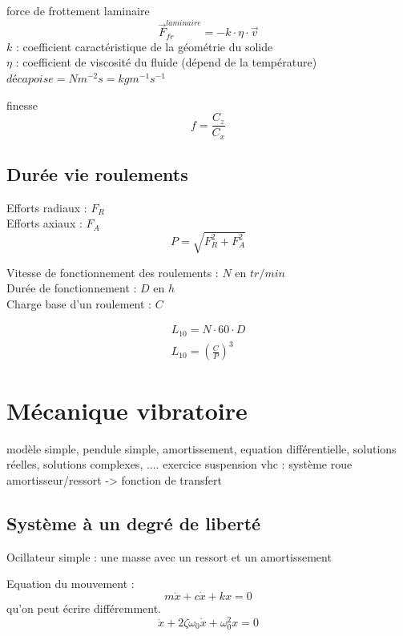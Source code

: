 	force de frottement laminaire
	\begin{equation}
	\vec{F}_{fr}^{laminaire}=-k \cdot \eta \cdot \vec{v} 
	\end{equation}
	$k$ : coefficient caractéristique de la géométrie du solide\\
	$\eta$ : coefficient de viscosité du fluide (dépend de la température) $décapoise = N m^{-2}s = kg m^{-1}s^{-1}$
	
	finesse
	\begin{equation}
	f= \frac{C_z}{C_x}
	\end{equation}
	
	
	\subsection{Durée vie roulements}
	Efforts radiaux : $F_R$\\
	Efforts axiaux : $F_A$ \\
	\begin{equation}
	P=\sqrt{F_R^2+F_A^2}
	\end{equation}
	
	Vitesse de fonctionnement des roulements : $N$ en $tr/min$\\
	Durée de fonctionnement : $D$ en $h$\\
	Charge base d'un roulement : $C$ 
	
	\begin{eqnarray}
	L_{10}=N \cdot 60 \cdot D\\
	L_{10}=(\frac{C}{P})^3
	\end{eqnarray}
	
	
	
	\newpage
	\section{Mécanique vibratoire}
	modèle simple, pendule simple, amortissement, equation différentielle, solutions réelles, solutions complexes, ....
	exercice suspension vhc : système roue amortisseur/ressort -> fonction de transfert
	
	\subsection{Système à un degré de liberté}
	
	Ocillateur simple : une masse avec un ressort et un amortissement
	
	Equation du mouvement :
	\begin{equation}
	m \ddot{x} + c \dot{x}+k x =0
	\end{equation}
	qu'on peut écrire différemment. 
	\begin{equation}
	\ddot{x} + 2\zeta \omega_0 \dot{x}+\omega_0^2  x =0
	\end{equation}
	

